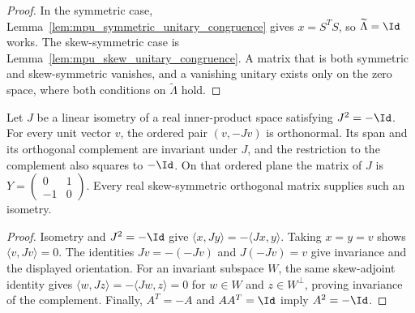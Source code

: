 \begin{proof}\leanok
    In the symmetric case, Lemma~\ref{lem:mpu_symmetric_unitary_congruence}
    gives $x=S^TS$, so $\widetilde\Lambda=\Id$ works. The skew-symmetric case
    is Lemma~\ref{lem:mpu_skew_unitary_congruence}. A matrix that is both
    symmetric and skew-symmetric vanishes, and a vanishing unitary exists
    only on the zero space, where both conditions on $\widetilde\Lambda$ hold.
\end{proof}

\begin{lemma}
    \label{lem:mpu_skew_orthogonal_plane}
    \leanok
    Let $J$ be a linear isometry of a real inner-product space satisfying
    $J^2=-\Id$. For every unit vector $v$, the ordered pair $(v,-Jv)$ is
    orthonormal. Its span and its orthogonal complement are invariant under
    $J$, and the restriction to the complement also squares to $-\Id$.
    On that ordered plane the matrix of $J$ is
    $Y=\left(\begin{smallmatrix}0&1\\-1&0\end{smallmatrix}\right)$.
    Every real skew-symmetric orthogonal matrix supplies such an isometry.
\end{lemma}

\begin{proof}\leanok
    Isometry and $J^2=-\Id$ give
    $\langle x,Jy\rangle=-\langle Jx,y\rangle$. Taking $x=y=v$ shows
    $\langle v,Jv\rangle=0$. The identities $Jv=-(-Jv)$ and
    $J(-Jv)=v$ give invariance and the displayed orientation. For an invariant
    subspace $W$, the same skew-adjoint identity gives
    $\langle w,Jz\rangle=-\langle Jw,z\rangle=0$ for $w\in W$ and
    $z\in W^\perp$, proving invariance of the complement. Finally,
    $A^T=-A$ and $AA^T=\Id$ imply $A^2=-\Id$.
\end{proof}

